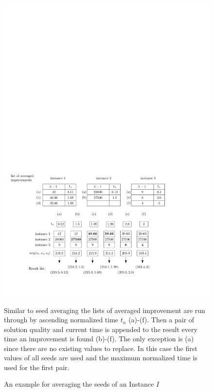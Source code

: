 \documentclass[a4paper,12pt,titlepage, BCOR7mm,headsepline]{scrbook}
\numberwithin{equation}{section}
\begin{document}
\begin{figure}[H] 
    
  \begin{center}
   \includegraphics[width=.9\textwidth]{Ipe/instanceaveragingexample.pdf}
  \caption{An example for averaging the seeds of an Instance $I$}\label{fig:averaginginstances} %
  \end{center}
    Similar to seed averaging the lists of averaged improvement are run through by ascending normalized time $t_n$ (a)-(f). Then a pair of solution quality and current time is appended to the result every time an improvement is found (b)-(f). The only exception is (a) since there are no existing values to replace. In this case the first values of all seeds are used and the maximum normalized time is used for the first pair.
\end{figure}

\newpage
\end{document}
